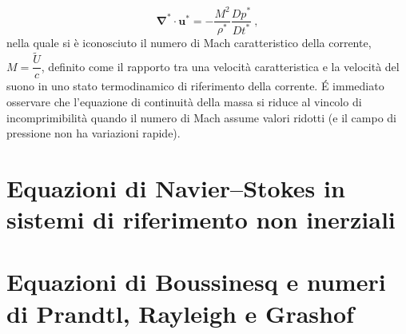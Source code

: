 \begin{equation}
 \bm{\nabla}^* \cdot \bm{u}^* = -  \dfrac{M^2}{\rho^*} \dfrac{D p^*}{D t^*} \ ,
\end{equation}
nella quale si è iconosciuto il numero di Mach caratteristico della corrente, $M = \dfrac{\tilde{U}}{c}$, definito come il rapporto tra una velocità caratteristica e la velocità del suono in uno stato termodinamico di riferimento della corrente.
\'E immediato osservare che l'equazione di continuità della massa si riduce al vincolo di incomprimibilità quando il numero di Mach assume valori ridotti (e il campo di pressione non ha variazioni rapide).

\section{Equazioni di Navier--Stokes in sistemi di riferimento non inerziali}


\section{Equazioni di Boussinesq e numeri di Prandtl, Rayleigh e Grashof}
